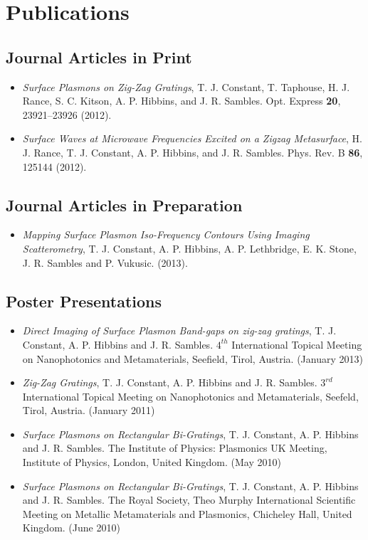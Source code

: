\chapter*{Publications}

\section*{Journal Articles in Print}
\begin{itemize}
\item[] \textit{Surface Plasmons on Zig-Zag Gratings}, T. J. Constant, T. Taphouse, H. J. Rance, S. C. Kitson, A. P. Hibbins, and J. R. Sambles. Opt. Express \textbf{20}, 23921--23926 (2012).

\item[] \textit{Surface Waves at Microwave Frequencies Excited on a Zigzag Metasurface}, H. J. Rance, T. J. Constant, A. P. Hibbins, and J. R. Sambles. Phys. Rev. B \textbf{86}, 125144 (2012).
\end{itemize}

\section*{Journal Articles in Preparation}
\begin{itemize}
\item[] \textit{Mapping Surface Plasmon Iso-Frequency Contours Using Imaging Scatterometry}, T. J. Constant, A. P. Hibbins,  A. P. Lethbridge, E. K. Stone, J. R. Sambles and P. Vukusic. (2013).
\end{itemize}

\section*{Poster Presentations}
\begin{itemize}
\item[] \textit{Direct Imaging of Surface Plasmon Band-gaps on zig-zag gratings}, T. J. Constant, A. P. Hibbins and J. R. Sambles. $4^{th}$ International Topical Meeting on Nanophotonics and Metamaterials, Seefield, Tirol, Austria. (January 2013)

\item[] \textit{Zig-Zag Gratings}, T. J. Constant, A. P. Hibbins and J. R. Sambles. $3^{rd}$ International Topical Meeting on Nanophotonics and Metamaterials, Seefeld, Tirol, Austria. (January 2011) 

\item[] \textit{Surface Plasmons on Rectangular Bi-Gratings}, T. J. Constant, A. P. Hibbins and J. R. Sambles. The Institute of Physics: Plasmonics UK Meeting, Institute of Physics, London, United Kingdom. (May 2010)

\item[] \textit{Surface Plasmons on Rectangular Bi-Gratings}, T. J. Constant, A. P. Hibbins and J. R. Sambles.  The Royal Society, Theo Murphy International Scientific Meeting on Metallic Metamaterials and Plasmonics, Chicheley Hall, United Kingdom. (June 2010)
\end{itemize}

